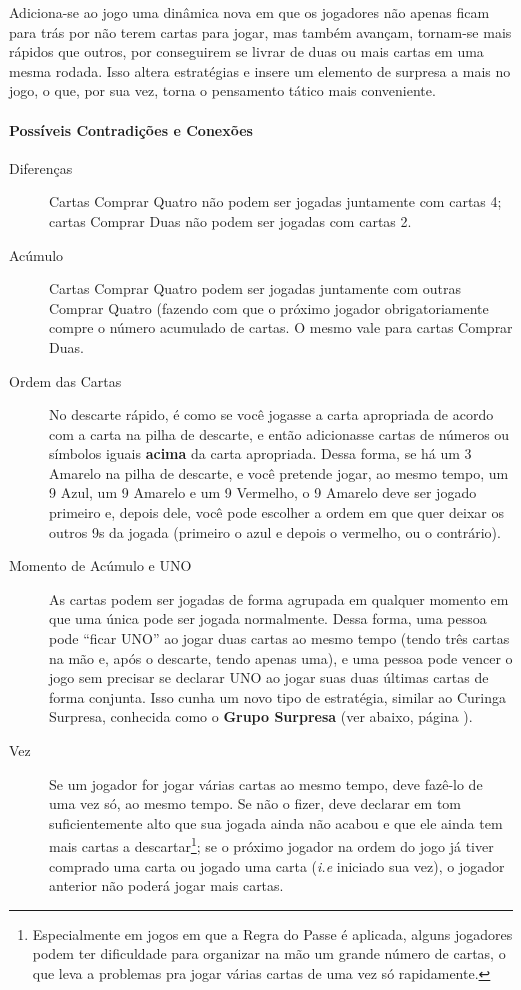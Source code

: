Adiciona-se ao jogo uma dinâmica nova em que os jogadores não apenas ficam para trás por não terem cartas para jogar, mas também avançam, tornam-se mais rápidos que outros, por conseguirem se livrar de duas ou mais cartas em uma mesma rodada. Isso altera estratégias e insere um elemento de surpresa a mais no jogo, o que, por sua vez, torna o pensamento tático mais conveniente. 

\paragraph{Possíveis Contradições e Conexões}

\begin{description}
\item[Diferenças]{Cartas Comprar Quatro não podem ser jogadas juntamente com cartas 4; cartas Comprar Duas não podem ser jogadas com cartas 2.}
\item[Acúmulo]{Cartas Comprar Quatro podem ser jogadas juntamente com outras Comprar Quatro (fazendo com que o próximo jogador obrigatoriamente compre o número acumulado de cartas. O mesmo vale para cartas Comprar Duas.}
\item[Ordem das Cartas]{No descarte rápido, é como se você jogasse a carta apropriada de acordo com a carta na pilha de descarte, e então adicionasse cartas de números ou símbolos iguais \textbf{acima} da carta apropriada. Dessa forma, se há um 3 Amarelo na pilha de descarte, e você pretende jogar, ao mesmo tempo, um 9 Azul, um 9 Amarelo e um 9 Vermelho, o 9 Amarelo deve ser jogado primeiro e, depois dele, você pode escolher a ordem em que quer deixar os outros 9s da jogada (primeiro o azul e depois o vermelho, ou o contrário).}
\item[Momento de Acúmulo e UNO]{As cartas podem ser jogadas de forma agrupada em qualquer momento em que uma única pode ser jogada normalmente. Dessa forma, uma pessoa pode ``ficar UNO'' ao jogar duas cartas ao mesmo tempo (tendo três cartas na mão e, após o descarte, tendo apenas uma), e uma pessoa pode vencer o jogo sem precisar se declarar UNO ao jogar suas duas últimas cartas de forma conjunta. Isso cunha um novo tipo de estratégia, similar ao Curinga Surpresa, conhecida como o \textbf{Grupo Surpresa} (ver abaixo, página \pageref{gruposurpresa}).}
\item[Vez]{Se um jogador for jogar várias cartas ao mesmo tempo, deve fazê-lo de uma vez só, ao mesmo tempo. Se não o fizer, deve declarar em tom suficientemente alto que sua jogada ainda não acabou e que ele ainda tem mais cartas a descartar\footnote{Especialmente em jogos em que a Regra do Passe é aplicada, alguns jogadores podem ter dificuldade para organizar na mão um grande número de cartas, o que leva a problemas pra jogar várias cartas de uma vez só rapidamente.}; se o próximo jogador na ordem do jogo já tiver comprado uma carta ou jogado uma carta (\emph{i.e} iniciado sua vez), o jogador anterior não poderá jogar mais cartas.}

\end{description}
